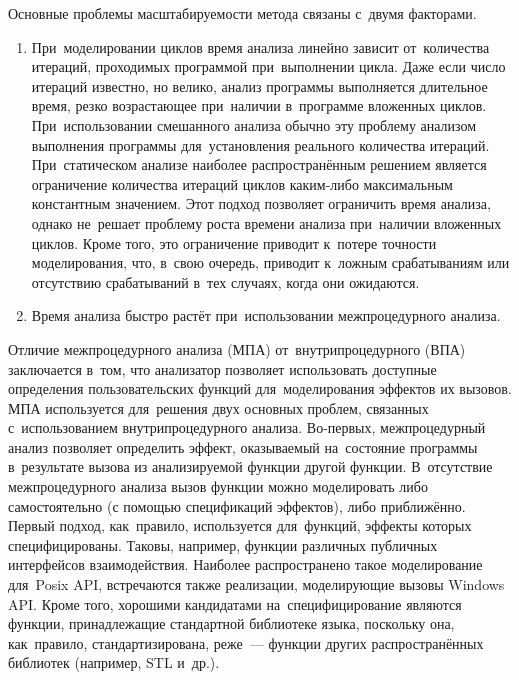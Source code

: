 Основные проблемы масштабируемости метода связаны с~двумя факторами.
\begin{enumerate}
 \item При~моделировании циклов время анализа линейно зависит от~количества итераций, проходимых программой при~выполнении цикла. Даже если число итераций известно, но велико, анализ программы выполняется длительное время, резко возрастающее при~наличии в~программе вложенных циклов. При~использовании смешанного анализа обычно эту проблему анализом выполнения программы для~установления реального количества итераций. При~статическом анализе наиболее распространённым решением является ограничение количества итераций циклов каким-либо максимальным константным значением. Этот подход позволяет ограничить время анализа, однако не~решает проблему роста времени анализа при~наличии вложенных циклов. Кроме того, это ограничение приводит к~потере точности моделирования, что, в~свою очередь, приводит к~ложным срабатываниям или отсутствию срабатываний в~тех случаях, когда они ожидаются.
 \item Время анализа быстро растёт при~использовании межпроцедурного анализа.
\end{enumerate}

Отличие межпроцедурного анализа (МПА) от~внутрипроцедурного (ВПА) заключается в~том, что анализатор позволяет использовать доступные определения пользовательских функций для~моделирования эффектов их вызовов. МПА используется для~решения двух основных проблем, связанных с~использованием внутрипроцедурного анализа. Во-первых, межпроцедурный анализ позволяет определить эффект, оказываемый на~состояние программы в~результате вызова из анализируемой функции другой функции. В~отсутствие межпроцедурного анализа вызов функции можно моделировать либо самостоятельно (с помощью спецификаций эффектов), либо приближённо. Первый подход, как~правило, используется для~функций, эффекты которых специфицированы. Таковы, например, функции различных публичных интерфейсов взаимодействия. Наиболее распространено такое моделирование для~Posix API, встречаются также реализации, моделирующие вызовы Windows API. Кроме того, хорошими кандидатами на~специфицирование являются функции, принадлежащие стандартной библиотеке языка, поскольку она, как~правило, стандартизирована, реже~--- функции других распространённых библиотек (например, STL и~др.).

